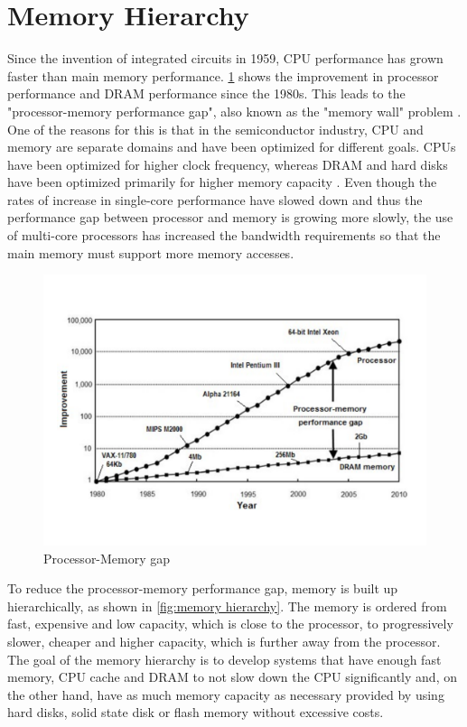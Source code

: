 \documentclass[
	12pt,
	a4paper,
	abstract,
	bibliography=totoc,
	chapterprefix,
	headings=openright,
	numbers=endperiod,
	parskip=half,
	twoside,
]{scrreprt}
\begin{document}
\section{Memory Hierarchy}
Since the invention of integrated circuits in 1959, CPU performance has grown faster than main memory performance.
\cref{fig:processor memory gap} shows the improvement in processor performance and DRAM performance since the 1980s.
This leads to the "processor-memory performance gap", also known as the "memory wall" problem \cite{wulf1995hitting}.
One of the reasons for this is that in the semiconductor industry, CPU and memory are separate domains and have been optimized for different goals.
CPUs have been optimized for higher clock frequency, whereas DRAM and hard disks have been optimized primarily for higher memory capacity \cite{cpu-mem-gap}.
Even though the rates of increase in single-core performance have slowed down and thus the performance gap between processor and memory is growing more slowly, the use of multi-core processors has increased the bandwidth requirements so that the main memory must support more memory accesses.

\begin{figure}[ht]
	\centering
	\includegraphics[scale=0.45]{processor_memory_gap.pdf}
	\caption{Processor-Memory gap \cite{cpu-mem-gap}}
		\label{fig:processor memory gap}
\end{figure}


To reduce the processor-memory performance gap, memory is built up hierarchically, as shown in \cref{fig:memory hierarchy}.
The memory is ordered from fast, expensive and low capacity, which is close to the processor, to progressively slower, cheaper and higher 
capacity, which is further away from the processor.
The goal of the memory hierarchy is to develop systems that have enough fast memory, 
CPU cache and DRAM to not slow down the CPU significantly and, on the other hand, have as much memory capacity 
as necessary provided by using hard disks, solid state disk or flash memory without excessive costs.
\end{document}
